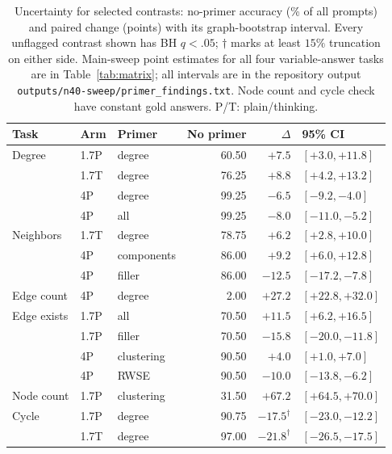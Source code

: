 \documentclass[11pt]{article}
\begin{document}
\begin{table}[H]
\centering\scriptsize\setlength{\tabcolsep}{3pt}
\begin{tabular}{@{}lllrrl@{}}
\toprule
Task & Arm & Primer & No primer & $\Delta$ & 95\% CI\\
\midrule
Degree & 1.7P & degree & 60.50 & $+7.5$ & {\scriptsize$[+3.0,+11.8]$}\\ %
 & 1.7T & degree & 76.25 & $+8.8$ & {\scriptsize$[+4.2,+13.2]$}\\ %
 & 4P & degree & 99.25 & $-6.5$ & {\scriptsize$[-9.2,-4.0]$}\\ %
 & 4P & all & 99.25 & $-8.0$ & {\scriptsize$[-11.0,-5.2]$}\\ %
\addlinespace[2pt]
Neighbors & 1.7T & degree & 78.75 & $+6.2$ & {\scriptsize$[+2.8,+10.0]$}\\ %
 & 4P & components & 86.00 & $+9.2$ & {\scriptsize$[+6.0,+12.8]$}\\ %
 & 4P & filler & 86.00 & $-12.5$ & {\scriptsize$[-17.2,-7.8]$}\\ %
\addlinespace[2pt]
Edge count & 4P & degree & 2.00 & $+27.2$ & {\scriptsize$[+22.8,+32.0]$}\\ %
\addlinespace[2pt]
Edge exists & 1.7P & all & 70.50 & $+11.5$ & {\scriptsize$[+6.2,+16.5]$}\\ %
 & 1.7P & filler & 70.50 & $-15.8$ & {\scriptsize$[-20.0,-11.8]$}\\ %
 & 4P & clustering & 90.50 & $+4.0$ & {\scriptsize$[+1.0,+7.0]$}\\ %
 & 4P & RWSE & 90.50 & $-10.0$ & {\scriptsize$[-13.8,-6.2]$}\\ %
\addlinespace[2pt]
Node count & 1.7P & clustering & 31.50 & $+67.2$ & {\scriptsize$[+64.5,+70.0]$}\\ %
\addlinespace[2pt]
Cycle & 1.7P & degree & 90.75 & $-17.5^{\dagger}$ & {\scriptsize$[-23.0,-12.2]$}\\ %
 & 1.7T & degree & 97.00 & $-21.8^{\dagger}$ & {\scriptsize$[-26.5,-17.5]$}\\ %
\bottomrule
\end{tabular}
\caption{Uncertainty for selected contrasts: no-primer accuracy (\% of all prompts) and paired change (points) with its graph-bootstrap interval. Every unflagged contrast shown has BH $q<.05$; $\dagger$ marks at least $15\%$ truncation on either side. Main-sweep point estimates for all four variable-answer tasks are in Table~\ref{tab:matrix}; all intervals are in the repository output \texttt{outputs/n40-sweep/}\allowbreak\texttt{primer\_findings.txt}. Node count and cycle check have constant gold answers. P/T: plain/thinking.} %
\label{tab:full}
\end{table}
\end{document}
